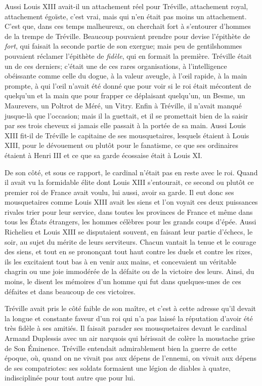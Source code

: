 Aussi Louis XIII avait-il un attachement réel pour Tréville, attachement royal, attachement égoïste, c'est vrai, mais qui n'en était pas moins un attachement. C'est que, dans ces temps malheureux, on cherchait fort à s'entourer d'hommes de la trempe de Tréville. Beaucoup pouvaient prendre pour devise l'épithète de \textit{fort}, qui faisait la seconde partie de son exergue; mais peu de gentilshommes pouvaient réclamer l'épithète de \textit{fidèle}, qui en formait la première. Tréville était un de ces derniers; c'était une de ces rares organisations, à l'intelligence obéissante comme celle du dogue, à la valeur aveugle, à l'œil rapide, à la main prompte, à qui l'œil n'avait été donné que pour voir si le roi était mécontent de quelqu'un et la main que pour frapper ce déplaisant quelqu'un, un Besme, un Maurevers, un Poltrot de Méré, un Vitry. Enfin à Tréville, il n'avait manqué jusque-là que l'occasion; mais il la guettait, et il se promettait bien de la saisir par ses trois cheveux si jamais elle passait à la portée de sa main. Aussi Louis XIII fit-il de Tréville le capitaine de ses mousquetaires, lesquels étaient à Louis XIII, pour le dévouement ou plutôt pour le fanatisme, ce que ses ordinaires étaient à Henri III et ce que sa garde écossaise était à Louis XI. 

De son côté, et sous ce rapport, le cardinal n'était pas en reste avec le roi. Quand il avait vu la formidable élite dont Louis XIII s'entourait, ce second ou plutôt ce premier roi de France avait voulu, lui aussi, avoir sa garde. Il eut donc ses mousquetaires comme Louis XIII avait les siens et l'on voyait ces deux puissances rivales trier pour leur service, dans toutes les provinces de France et même dans tous les États étrangers, les hommes célèbres pour les grands coups d'épée. Aussi Richelieu et Louis XIII se disputaient souvent, en faisant leur partie d'échecs, le soir, au sujet du mérite de leurs serviteurs. Chacun vantait la tenue et le courage des siens, et tout en se prononçant tout haut contre les duels et contre les rixes, ils les excitaient tout bas à en venir aux mains, et concevaient un véritable chagrin ou une joie immodérée de la défaite ou de la victoire des leurs. Ainsi, du moins, le disent les mémoires d'un homme qui fut dans quelques-unes de ces défaites et dans beaucoup de ces victoires. 

Tréville avait pris le côté faible de son maître, et c'est à cette adresse qu'il devait la longue et constante faveur d'un roi qui n'a pas laissé la réputation d'avoir été très fidèle à ses amitiés. Il faisait parader ses mousquetaires devant le cardinal Armand Duplessis avec un air narquois qui hérissait de colère la moustache grise de Son Éminence. Tréville entendait admirablement bien la guerre de cette époque, où, quand on ne vivait pas aux dépens de l'ennemi, on vivait aux dépens de ses compatriotes: ses soldats formaient une légion de diables à quatre, indisciplinée pour tout autre que pour lui. 

